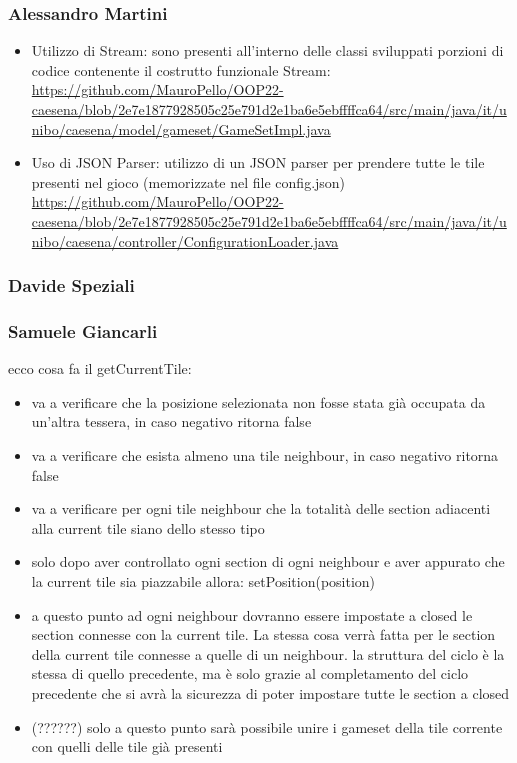 \subsubsection*{Alessandro Martini}
\begin{itemize}
    \item Utilizzo di Stream: sono presenti all'interno delle classi sviluppati porzioni di codice contenente il costrutto funzionale Stream: \url{https://github.com/MauroPello/OOP22-caesena/blob/2e7e1877928505c25e791d2e1ba6e5ebffffca64/src/main/java/it/unibo/caesena/model/gameset/GameSetImpl.java}
    \item Uso di JSON Parser: utilizzo di un JSON parser per prendere tutte le tile presenti nel gioco (memorizzate nel file config.json) \url{https://github.com/MauroPello/OOP22-caesena/blob/2e7e1877928505c25e791d2e1ba6e5ebffffca64/src/main/java/it/unibo/caesena/controller/ConfigurationLoader.java}
\end{itemize}

\subsubsection*{Davide Speziali}

\subsubsection*{Samuele Giancarli}
ecco cosa fa il getCurrentTile:

\begin{itemize}
\item va a verificare che la posizione selezionata non fosse stata già occupata da un’altra tessera, in caso negativo ritorna false
\item va a verificare che esista almeno una tile neighbour, in caso negativo ritorna false
\item va a verificare per ogni tile neighbour che la totalità delle section adiacenti alla current tile siano dello stesso tipo
\item solo dopo aver controllato ogni section di ogni neighbour e aver appurato che la current tile sia piazzabile allora: setPosition(position)
\item a questo punto ad ogni neighbour dovranno essere impostate a closed le section connesse con la current tile. La stessa cosa verrà fatta per le section della current tile connesse a quelle di un neighbour.
\subitem la struttura del ciclo è la stessa di quello precedente, ma è solo grazie al completamento del ciclo precedente che si avrà la sicurezza di poter impostare tutte le section a closed
\item (??????) solo a questo punto sarà possibile unire i gameset della tile corrente con quelli delle tile già presenti
\end{itemize}